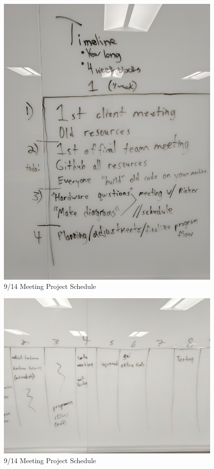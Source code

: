 \documentclass[12pt]{article}
\begin{document}
	\begin{figure}[!htb]
		\centering
		\includegraphics[width=140mm]{assets/9-14_Project_Agenda_1.jpg}
		\caption{9/14 Meeting Project Schedule \label{overflow}}
	\end{figure}

	\begin{figure}[!htb]
		\centering
		\includegraphics[width=140mm]{assets/9-14_Project_Agenda_2.jpg}
		\caption{9/14 Meeting Project Schedule \label{overflow}}
	\end{figure}
	
\end{document}
